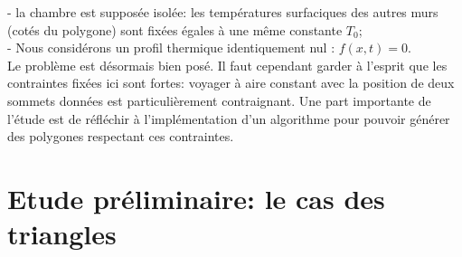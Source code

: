 \documentclass[a4paper,reqno]{article}
\begin{document}
- la chambre est supposée isolée: les températures surfaciques des autres murs (cotés du polygone) sont fixées égales à une même constante $T_{0}$; \\
- Nous considérons un profil thermique identiquement nul : $f(x,t)  = 0$.
\\
Le problème est désormais bien posé. Il faut cependant garder à l'esprit que les contraintes fixées ici sont fortes: voyager à aire constant avec la position de deux sommets données est particulièrement contraignant. Une part importante de l'étude est de réfléchir à l'implémentation d'un algorithme pour pouvoir générer des polygones respectant ces contraintes.


\part{Etude préliminaire: le cas des triangles}

\end{document}
